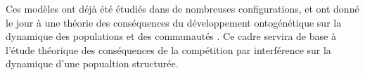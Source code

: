 Ces modèles ont déjà été
étudiés dans de nombreuses configurations, et ont donné le jour à une théorie
des conséquences du développement ontogénétique sur la dynamique des populations
et des communautés \autocite{de-roos2012a}. Ce cadre servira de base
à l'étude théorique des conséquences de la compétition par interférence sur la
dynamique d'une popualtion structurée. 
